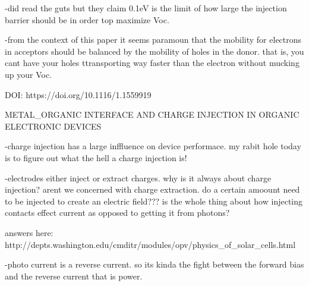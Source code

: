     -did read the guts but they claim 0.1eV is the limit of how large the injection barrier should be
        in order top maximize Voc. 

    -from the context of this paper it seems paramoun that the mobility for electrons in acceptors
    should be balanced by the mobility of holes in the donor. that is, you cant have your holes 
    ttransporting way faster than the electron without mucking up your Voc.
    

DOI: https://doi.org/10.1116/1.1559919

        METAL_ORGANIC INTERFACE AND CHARGE INJECTION IN ORGANIC ELECTRONIC DEVICES

    -charge injection has a large inffluence on device performace. my rabit hole today is to figure out 
    what the hell a charge injection is!

    -electrodes either inject or extract charges. why is it always about charge injection? arent we 
    concerned with charge  extraction. do a certain amoount need to be injected to create an electric
    field??? is the whole thing about how injecting contacts effect current as opposed to getting it
    from photons?

    answers here: http://depts.washington.edu/cmditr/modules/opv/physics_of_solar_cells.html

        -photo current is a reverse current. so its kinda the fight between the forward bias and
        the reverse current that is power. 
